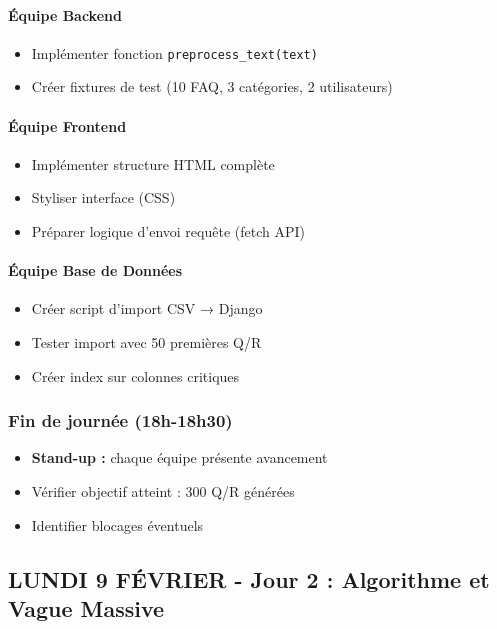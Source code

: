 \documentclass[11pt,a4paper]{article}
\begin{document}
\paragraph{Équipe Backend}
\begin{itemize}
    \item[$\square$] Implémenter fonction \texttt{preprocess\_text(text)}
    \item[$\square$] Créer fixtures de test (10 FAQ, 3 catégories, 2 utilisateurs)
\end{itemize}

\paragraph{Équipe Frontend}
\begin{itemize}
    \item[$\square$] Implémenter structure HTML complète
    \item[$\square$] Styliser interface (CSS)
    \item[$\square$] Préparer logique d'envoi requête (fetch API)
\end{itemize}

\paragraph{Équipe Base de Données}
\begin{itemize}
    \item[$\square$] Créer script d'import CSV → Django
    \item[$\square$] Tester import avec 50 premières Q/R
    \item[$\square$] Créer index sur colonnes critiques
\end{itemize}

\subsubsection{Fin de journée (18h-18h30)}
\begin{itemize}
    \item[$\square$] \textbf{Stand-up :} chaque équipe présente avancement
    \item[$\square$] Vérifier objectif atteint : 300 Q/R générées
    \item[$\square$] Identifier blocages éventuels
\end{itemize}

\clearpage

\subsection{LUNDI 9 FÉVRIER - Jour 2 : Algorithme et Vague Massive}
\end{document}
